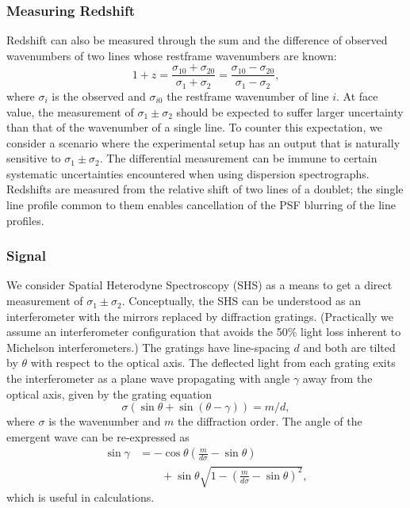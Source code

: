 \documentclass[preprint2, 10pt]{aastex}
\begin{document}
{\subsubsection{Measuring Redshift}
Redshift can also be measured through the sum and the difference of observed wavenumbers of two lines whose restframe wavenumbers are known:
\begin{equation}
1+z=\frac{\sigma_{10}+\sigma_{20}}{\sigma_{1}+\sigma_{2}}=\frac{\sigma_{10}-\sigma_{20}}{\sigma_{1}-\sigma_{2}},
\label{redshift:eqn}
\end{equation}
where $\sigma_i$ is the observed and $\sigma_{i0}$ the restframe wavenumber of line $i$.
At face value, the measurement of $\sigma_1\pm\sigma_2$ should be expected to suffer larger uncertainty than that of the wavenumber
of a single line.  
To counter this expectation, we consider a scenario where the experimental setup has an output that is naturally sensitive
to $\sigma_1\pm\sigma_2$.  The differential measurement can be immune to certain systematic uncertainties encountered when using dispersion spectrographs.
Redshifts are measured from the relative shift of two lines of a doublet; 
the single line profile common to them enables cancellation of the PSF blurring of the
line profiles.


\subsubsection{Signal}

We consider Spatial Heterodyne Spectroscopy (SHS) \citep{1990SPIE.1235..622H}
as a means to get a direct measurement of  $\sigma_1\pm\sigma_2$.
Conceptually, the SHS can be understood as an interferometer with the  mirrors replaced by diffraction gratings.
(Practically we assume an interferometer configuration that  avoids the 50\% light loss inherent to  Michelson interferometers.)
The gratings have line-spacing $d$ and both are tilted
by $\theta$ with respect to the optical axis.  The deflected light from each grating exits the interferometer as a plane wave
propagating with angle $\gamma$ away from the optical axis,  given by the grating equation
\begin{equation}
\sigma\left(\sin{\theta}+\sin{\left(\theta-\gamma\right)}\right)=m/d,
\end{equation}
where $\sigma$ is the wavenumber and $m$ the diffraction order.
The angle of the emergent wave can be re-expressed as
\begin{align}
\sin{\gamma} & =-\cos{\theta} \left(\frac{m}{d\sigma} - \sin{\theta} \right) \nonumber \\
& \qquad + \sin{\theta}\sqrt{1-\left(\frac{m}{d\sigma} -\sin{\theta} \right)^2},
\end{align}
which is useful in calculations.

}
\end{document}
